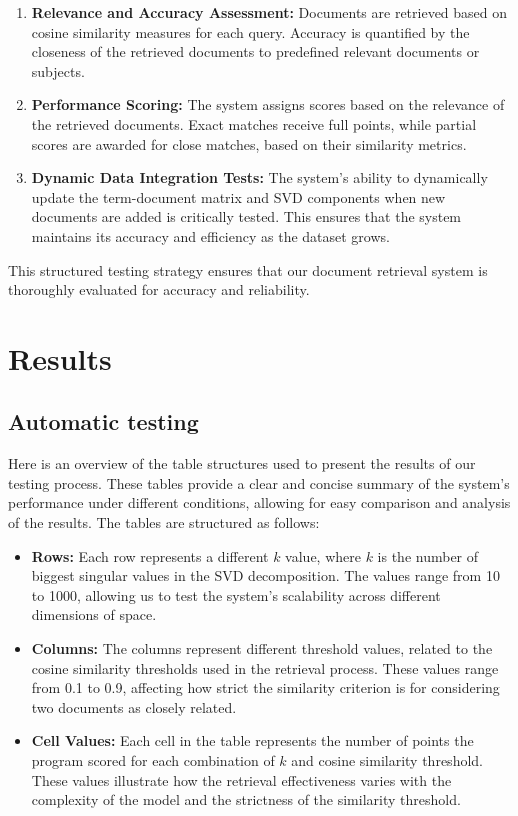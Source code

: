 \documentclass[12pt,a4paper]{article}
\begin{document}
\begin{enumerate}
    \item \textbf{Relevance and Accuracy Assessment:} Documents are retrieved based on cosine similarity measures for each query. Accuracy is quantified by the closeness of the retrieved documents to predefined relevant documents or subjects.
    \item \textbf{Performance Scoring:} The system assigns scores based on the relevance of the retrieved documents. Exact matches receive full points, while partial scores are awarded for close matches, based on their similarity metrics.
    \item \textbf{Dynamic Data Integration Tests:} The system's ability to dynamically update the term-document matrix and SVD components when new documents are added is critically tested. This ensures that the system maintains its accuracy and efficiency as the dataset grows.
\end{enumerate}

\noindent
This structured testing strategy ensures that our document retrieval system is thoroughly evaluated for accuracy and reliability.

\newpage

\section{Results}

\subsection{Automatic testing}
Here is an overview of the table structures used to present the results of our testing process. These tables provide a clear and concise summary of the system's performance under different conditions, allowing for easy comparison and analysis of the results. The tables are structured as follows:
\begin{itemize}
  \item \textbf{Rows:} Each row represents a different \( k \) value, where \( k \) is the number of biggest singular values in the SVD decomposition. The values range from 10 to 1000, allowing us to test the system's scalability across different dimensions of space.
  \item \textbf{Columns:} The columns represent different threshold values, related to the cosine similarity thresholds used in the retrieval process. These values range from 0.1 to 0.9, affecting how strict the similarity criterion is for considering two documents as closely related.
  \item \textbf{Cell Values:} Each cell in the table represents the number of points the program scored for each combination of \( k \) and cosine similarity threshold. These values illustrate how the retrieval effectiveness varies with the complexity of the model and the strictness of the similarity threshold.
\end{itemize}
\end{document}
